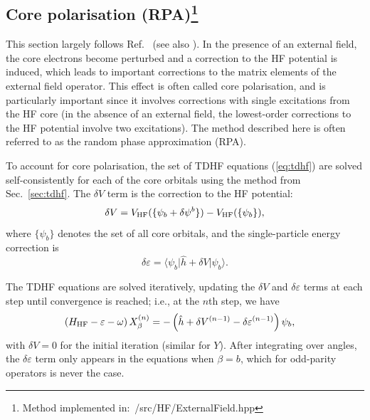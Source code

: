 \documentclass[10pt,twocolumn,a4paper]{article}%
\newcommand{\bra}[1]{\ensuremath{\langle #1|}}	%
\newcommand{\ket}[1]{\ensuremath{|#1\rangle}}	%
\newcommand{\be}{\begin{equation}}
\newcommand{\ee}{\end{equation}}
\def\en{\ensuremath{\varepsilon}}
\renewcommand{\b}{\ensuremath{\beta}}
\newcommand{\w}{\ensuremath{\omega}}
\begin{document}




\subsection[Core polarisation (RPA)]{Core polarisation (RPA)\footnote{Method implemented in:~/src/HF/ExternalField.hpp}}

This section largely follows Ref.~\cite{DzubaHFS1984} (see also \cite{Dzuba2018a,Manakov1986,Johnson1980,Johnson1989}).
In the presence of an external field, the core electrons become perturbed and a correction to the HF potential is induced, which leads to important corrections to the matrix elements of the external field operator.
This effect is often called core polarisation, and is particularly important since it involves corrections with single excitations from the HF core (in the absence of an external field, the lowest-order corrections to the HF potential involve two excitations).
The method described here is often referred to as the random phase approximation (RPA).


To account for core polarisation, the set of TDHF equations (\ref{eq:tdhf}) are solved self-consistently for each of the core orbitals using the method from Sec.~\ref{sec:tdhf}.
%
The $\delta V$ term is the correction to the HF potential: %
\be\label{eq:delV-simple}
\delta V = V_{\rm HF}(\{\psi_b + \delta\psi^b\}) - V_{\rm HF}(\{\psi_b\}),
\ee
where $\{\psi_b\}$ denotes the set of all core orbitals, and the single-particle energy correction is
\be
\delta\en = \bra{\psi_b}\hat h + \delta V\ket{\psi_b}.
\ee

The TDHF equations are solved iteratively, updating the $\delta V$ and $\delta \en$  terms at each step
until convergence is reached; i.e., at the $n$th step, we have
\begin{equation}\begin{split}
\label{eq:tdhf-rpa}
\left( H_{\rm HF} - \en -\w \right)X_\beta^{(n)} &= -\left(\hat h + \delta V^{(n-1)} - \delta \en^{(n-1)} \right)\psi_b,
\end{split}\end{equation}
with $\delta V=0$ for the initial iteration (similar for $Y$).
After integrating over angles, the $\delta\en$ term only appears in the equations when $\b=b$, which for odd-parity operators is never the case.
\end{document}
